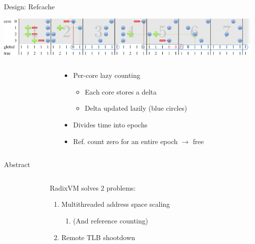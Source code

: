 \documentclass[aspectratio=169]{beamer}
\newcommand{\bi}{\begin{itemize}}
\newcommand{\ei}{\end{itemize}}
\newcommand{\bn}{\begin{enumerate}}
\newcommand{\en}{\end{enumerate}}
\begin{document}
\begin{frame}{Design: Refcache}
  \begin{center}
  \includegraphics[scale=0.9]{./figures/refcache.pdf}
  \end{center}
  \begin{columns}[T]
    \begin{column}{0.4\textwidth}
    \end{column}
    \begin{column}{0.6\textwidth}
      \bi
    \item Per-core lazy counting
      \bi
      \pause
    \item Each core stores a delta
      \pause
    \item Delta updated lazily (blue circles)
      \ei
      \pause
    \item Divides time into epochs
      \pause
    \item Ref. count zero for an entire epoch $\rightarrow$ free
      \ei
    \end{column}
  \end{columns}
\end{frame}

\begin{frame}{Abstract}
  \begin{columns}[T]
    \begin{column}{0.3\textwidth}
    \end{column}
    \begin{column}{0.4\textwidth}
      RadixVM solves 2 problems:
      \bn
    \item Multithreaded address space scaling
      \bn
    \item (And reference counting)
      \en
    \item {Remote TLB shootdown}
      \en
    \end{column}
    \begin{column}{0.3\textwidth}
    \end{column}
  \end{columns}
\end{frame}
\end{document}
